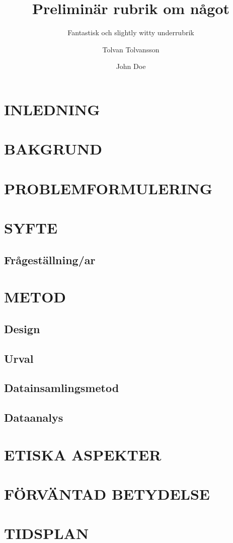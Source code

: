 \documentclass[
    a4paper,
    12pt,
    halfparskip,
]{rkhpm}
\title{Preliminär rubrik om något}
\subtitle{Fantastisk och slightly witty underrubrik}
\author{Tolvan Tolvansson \and John Doe}
\begin{document}
 

\maketitle
\thispagestyle{empty}
\setcounter{page}{0}

\section*{INLEDNING}

\section*{BAKGRUND}

\section*{PROBLEMFORMULERING}

\section*{SYFTE}

\subsection*{Frågeställning/ar}

\section*{METOD}

\subsection*{Design}

\subsection*{Urval}

\subsection*{Datainsamlingsmetod}

\subsection*{Dataanalys}

\section*{ETISKA ASPEKTER}

\section*{FÖRVÄNTAD BETYDELSE}

%

\section*{TIDSPLAN}
\end{document}
